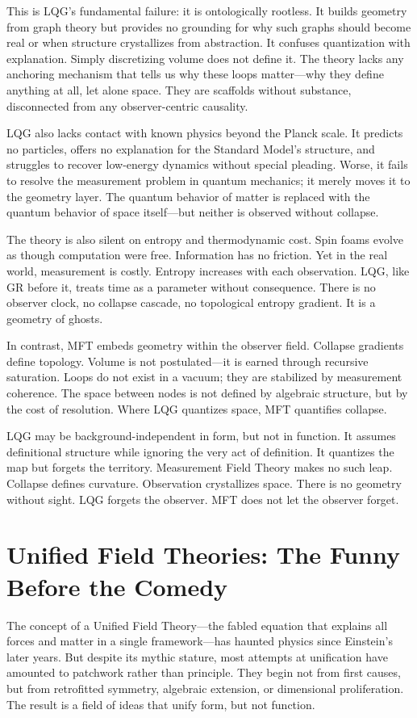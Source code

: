 This is LQG's fundamental failure: it is ontologically rootless. It builds geometry from graph theory but provides no grounding for why such graphs should become real or when structure crystallizes from abstraction. It confuses quantization with explanation. Simply discretizing volume does not define it. The theory lacks any anchoring mechanism that tells us why these loops matter—why they define anything at all, let alone space. They are scaffolds without substance, disconnected from any observer-centric causality.

LQG also lacks contact with known physics beyond the Planck scale. It predicts no particles, offers no explanation for the Standard Model’s structure, and struggles to recover low-energy dynamics without special pleading. Worse, it fails to resolve the measurement problem in quantum mechanics; it merely moves it to the geometry layer. The quantum behavior of matter is replaced with the quantum behavior of space itself—but neither is observed without collapse.

The theory is also silent on entropy and thermodynamic cost. Spin foams evolve as though computation were free. Information has no friction. Yet in the real world, measurement is costly. Entropy increases with each observation. LQG, like GR before it, treats time as a parameter without consequence. There is no observer clock, no collapse cascade, no topological entropy gradient. It is a geometry of ghosts.

In contrast, MFT embeds geometry within the observer field. Collapse gradients define topology. Volume is not postulated—it is earned through recursive saturation. Loops do not exist in a vacuum; they are stabilized by measurement coherence. The space between nodes is not defined by algebraic structure, but by the cost of resolution. Where LQG quantizes space, MFT quantifies collapse.

LQG may be background-independent in form, but not in function. It assumes definitional structure while ignoring the very act of definition. It quantizes the map but forgets the territory. Measurement Field Theory makes no such leap. Collapse defines curvature. Observation crystallizes space. There is no geometry without sight. LQG forgets the observer. MFT does not let the observer forget.

\section{Unified Field Theories: The Funny Before the Comedy}
The concept of a Unified Field Theory—the fabled equation that explains all forces and matter in a single framework—has haunted physics since Einstein's later years. But despite its mythic stature, most attempts at unification have amounted to patchwork rather than principle. They begin not from first causes, but from retrofitted symmetry, algebraic extension, or dimensional proliferation. The result is a field of ideas that unify form, but not function.


